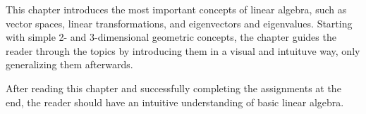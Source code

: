 This chapter introduces the most important concepts of linear algebra, such as vector spaces, linear transformations, and eigenvectors and eigenvalues. Starting with simple 2- and 3-dimensional geometric concepts, the chapter guides the reader through the topics by introducing them in a visual and intuituve way, only generalizing them afterwards.

After reading this chapter and successfully completing the assignments at the end, the reader should have an intuitive understanding of basic linear algebra.
